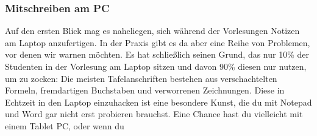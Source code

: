 		\subsubsection{Mitschreiben am PC}
			Auf den ersten Blick mag es naheliegen, sich
			während der Vorlesungen Notizen  am Laptop
			anzufertigen. In der Praxis gibt es da aber eine
			Reihe von Problemen, vor denen wir  warnen
			möchten. Es hat schließlich seinen Grund, das
			nur 10\% der Studenten in der Vorlesung am
			Laptop sitzen und davon 90\% diesen nur nutzen,
			um zu zocken: Die meisten Tafelanschriften
			bestehen  aus verschachtelten Formeln,
			fremdartigen Buchstaben und verworrenen
			Zeichnungen. Diese in Echtzeit in den Laptop
			einzuhacken ist eine besondere Kunst, die du mit
			Notepad und Word gar nicht erst probieren
			brauchst. Eine Chance hast du vielleicht mit
			einem Tablet PC, oder wenn du
